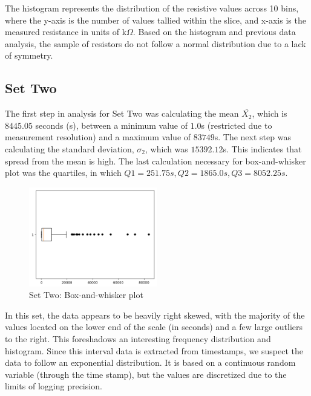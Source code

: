 \documentclass[10pt]{report}
\begin{document}
The histogram represents the distribution of the resistive values across 10 bins, where the y-axis 
is the number of values tallied within the slice, and x-axis is the measured resistance in units of k$\Omega$.
Based on the histogram and previous data analysis, the sample of resistors do not follow a
normal distribution due to a lack of symmetry.



\subsection*{Set Two}

The first step in analysis for Set Two was calculating the mean $\bar{X_2}$, which is $8445.05$ seconds (s),
between a minimum value of $1.0$s (restricted due to measurement resolution) and a maximum value of $83749$s. 
The next step was calculating the standard deviation, $\sigma_2$, which was $15392.12$s. 
This indicates that spread from the mean is high. The last calculation necessary for box-and-whisker plot was the quartiles,
in which $Q1 = 251.75s, Q2 = 1865.0s, Q3 = 8052.25s$.

\begin{figure}
	\centering
	\includegraphics[width=0.50\textwidth]{results/logininterval_boxplot}
	\caption{Set Two: Box-and-whisker plot}
\end{figure}

In this set, the data appears to be heavily right skewed, with the majority of the values located on the lower
end of the scale (in seconds) and a few large outliers to the right. This foreshadows an interesting frequency
distribution and histogram. Since this interval data is extracted from timestamps, we suspect the data to follow an
exponential distribution. It is based on a continuous random variable (through the time stamp), but the values are
discretized due to the limits of logging precision.
\end{document}
